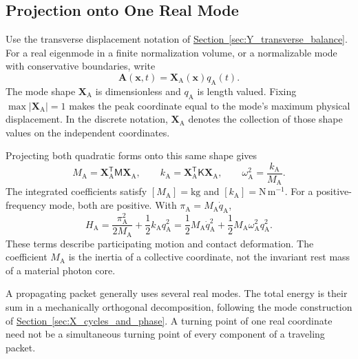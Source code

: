 \subsection{Projection onto One Real Mode}

Use the transverse displacement notation of \hyperref[sec:Y_transverse_balance]{Section~\ref*{sec:Y_transverse_balance}}. For a real eigenmode in a finite normalization volume, or a normalizable mode with conservative boundaries, write
\begin{equation}
    \mathbf A(\mathbf x,t)
    =\mathbf X_{\mathrm A}(\mathbf x)q_{\mathrm A}(t).
\end{equation}
The mode shape $\mathbf X_{\mathrm A}$ is dimensionless and $q_{\mathrm A}$ is length valued. Fixing $\max|\mathbf X_{\mathrm A}|=1$ makes the peak coordinate equal to the mode's maximum physical displacement. In the discrete notation, $\mathbf X_{\mathrm A}$ denotes the collection of those shape values on the independent coordinates.

Projecting both quadratic forms onto this same shape gives
\begin{equation}
    M_{\mathrm A}
    =\mathbf X_{\mathrm A}^{\mathsf T}\mathsf M\mathbf X_{\mathrm A},
    \qquad
    k_{\mathrm A}
    =\mathbf X_{\mathrm A}^{\mathsf T}\mathsf K\mathbf X_{\mathrm A},
    \qquad
    \omega_{\mathrm A}^{2}=\frac{k_{\mathrm A}}{M_{\mathrm A}}.
\end{equation}
The integrated coefficients satisfy $[M_{\mathrm A}]=\mathrm{kg}$ and $[k_{\mathrm A}]=\mathrm{N\,m^{-1}}$. For a positive-frequency mode, both are positive. With $\pi_{\mathrm A}=M_{\mathrm A}\dot q_{\mathrm A}$,
\begin{equation}
    \boxed{
    H_{\mathrm A}
    =\frac{\pi_{\mathrm A}^{2}}{2M_{\mathrm A}}
    +\frac12k_{\mathrm A}q_{\mathrm A}^{2}
    =\frac12M_{\mathrm A}\dot q_{\mathrm A}^{2}
    +\frac12M_{\mathrm A}\omega_{\mathrm A}^{2}q_{\mathrm A}^{2}
    }.
\end{equation}
These terms describe participating motion and contact deformation. The coefficient $M_{\mathrm A}$ is the inertia of a collective coordinate, not the invariant rest mass of a material photon core.

A propagating packet generally uses several real modes. The total energy is their sum in a mechanically orthogonal decomposition, following the mode construction of \hyperref[sec:X_cycles_and_phase]{Section~\ref*{sec:X_cycles_and_phase}}. A turning point of one real coordinate need not be a simultaneous turning point of every component of a traveling packet.

